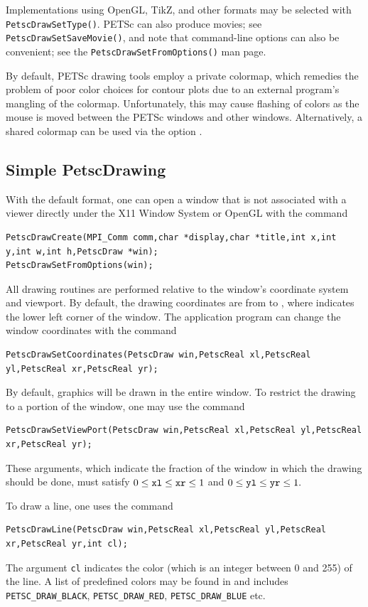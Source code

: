 {{{Implementations using OpenGL, TikZ, and other formats may be selected with
\lstinline{PetscDrawSetType()}.
PETSc can also produce movies; see \lstinline{PetscDrawSetSaveMovie()}, and
note that command-line options can also be convenient; see the \lstinline{PetscDrawSetFromOptions()} man page.

\medskip
By default, PETSc drawing tools employ a private colormap,
which remedies the problem of poor color choices for contour plots due
to an external program's mangling of the colormap.
Unfortunately, this may cause flashing of colors as the mouse is moved
between the PETSc windows and other windows.  Alternatively, a shared
colormap can be used via the option .

\subsection{Simple PetscDrawing}

With the default format, one can open a window that is not associated with a viewer directly
under the X11 Window System or OpenGL with the
command  
\begin{lstlisting}
PetscDrawCreate(MPI_Comm comm,char *display,char *title,int x,int y,int w,int h,PetscDraw *win);
PetscDrawSetFromOptions(win);
\end{lstlisting}
All drawing routines are performed relative to the window's coordinate system
and viewport. By default, the drawing coordinates are from  to
, where  indicates the lower left corner of the
window. The application program can change the window coordinates with the
command  
\begin{lstlisting}
PetscDrawSetCoordinates(PetscDraw win,PetscReal xl,PetscReal yl,PetscReal xr,PetscReal yr);
\end{lstlisting}
By default, graphics will be drawn in the entire window. To restrict the
drawing to a portion of the window, one may
use the command
\begin{lstlisting}
PetscDrawSetViewPort(PetscDraw win,PetscReal xl,PetscReal yl,PetscReal xr,PetscReal yr);
\end{lstlisting}
These arguments, which indicate the fraction of the window in which the
drawing should be done, must satisfy
$ 0 \leq {\tt xl} \leq {\tt xr} \leq 1 $ and $ 0 \leq {\tt yl} \leq {\tt yr} \leq 1.$

To draw a line, one uses
 the command 
\begin{lstlisting}
PetscDrawLine(PetscDraw win,PetscReal xl,PetscReal yl,PetscReal xr,PetscReal yr,int cl);
\end{lstlisting}
The argument \lstinline{cl} indicates the color (which is an integer between 0 and 255)
of the line. A list of predefined colors may be found in 
and includes \lstinline{PETSC_DRAW_BLACK}, \lstinline{PETSC_DRAW_RED}, \lstinline{PETSC_DRAW_BLUE} etc.

}}}
